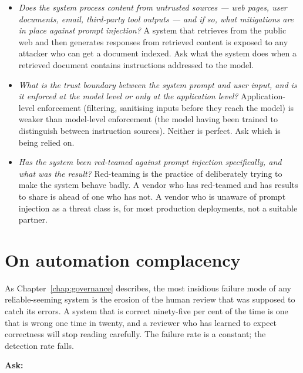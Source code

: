\begin{itemize}
  \item \emph{Does the system process content from untrusted
        sources --- web pages, user documents, email,
        third-party tool outputs --- and if so, what
        mitigations are in place against prompt injection?}
        A system that retrieves from the public web and
        then generates responses from retrieved content
        is exposed to any attacker who can get a document
        indexed. Ask what the system does when a retrieved
        document contains instructions addressed to the
        model.

  \item \emph{What is the trust boundary between the
        system prompt and user input, and is it enforced
        at the model level or only at the application level?}
        Application-level enforcement (filtering, sanitising
        inputs before they reach the model) is weaker
        than model-level enforcement (the model having been
        trained to distinguish between instruction sources).
        Neither is perfect. Ask which is being relied on.

  \item \emph{Has the system been red-teamed against
        prompt injection specifically, and what was the
        result?} Red-teaming is the practice of deliberately
        trying to make the system behave badly. A vendor
        who has red-teamed and has results to share is
        ahead of one who has not. A vendor who is unaware
        of prompt injection as a threat class is, for most
        production deployments, not a suitable partner.
\end{itemize}

\section{On automation complacency}

As Chapter~\ref{chap:governance} describes, the most insidious failure mode of
any reliable-seeming system is the erosion of the human
review that was supposed to catch its errors. A system that
is correct ninety-five per cent of the time is one that is
wrong one time in twenty, and a reviewer who has learned to
expect correctness will stop reading carefully. The failure
rate is a constant; the detection rate falls.

\medskip
\noindent\textbf{Ask:}

